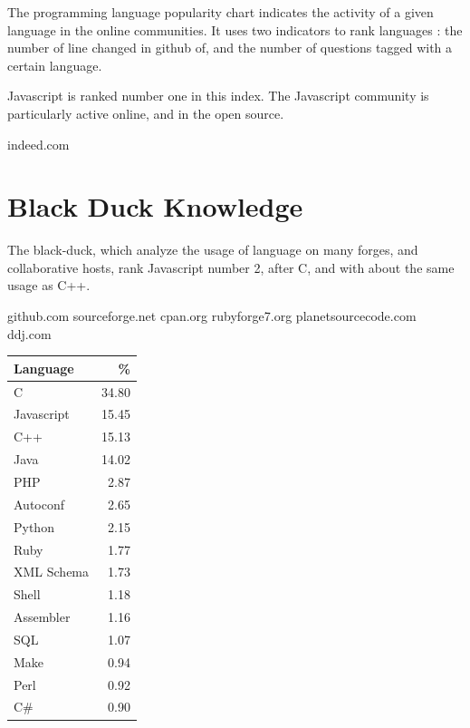 The programming language popularity chart indicates the activity of a given language in the online communities.
It uses two indicators to rank languages : the number of line changed in github of, and the number of questions tagged with a certain language.

% 

Javascript is ranked number one in this index.
The Javascript community is particularly active online, and in the open source.






indeed.com


\section{Black Duck Knowledge}

The black-duck, which analyze the usage of language on many forges, and collaborative hosts, rank Javascript number 2, after C, and with about the same usage as C++.

github.com 
sourceforge.net 
cpan.org 
rubyforge7.org 
planetsourcecode.com 
ddj.com

\begin{tabular}{l r}
Language     & \%     \\ \hline\hline
C            & 34.80  \\ \hline
Javascript   & 15.45  \\ \hline
C++          & 15.13  \\ \hline
Java         & 14.02  \\ \hline
PHP          & 2.87   \\ \hline
Autoconf     & 2.65   \\ \hline
Python       & 2.15   \\ \hline
Ruby         & 1.77   \\ \hline
XML Schema   & 1.73   \\ \hline
Shell        & 1.18   \\ \hline
Assembler    & 1.16   \\ \hline
SQL          & 1.07   \\ \hline
Make         & 0.94   \\ \hline
Perl         & 0.92   \\ \hline
C\#          & 0.90   \\ \hline
\end{tabular}

